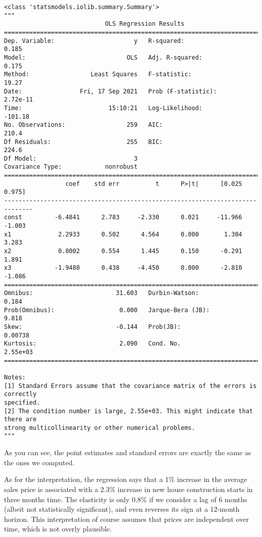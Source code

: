 \documentclass[10pt]{scrartcl}
\makeatletter
\newcommand{\boxspacing}{\kern\kvtcb@left@rule\kern\kvtcb@boxsep}
\newcommand{\prompt}[4]{
        {\ttfamily\llap{{\color{#2}[#3]:\hspace{3pt}#4}}\vspace{-\baselineskip}}
    }
\makeatother
\begin{document}
            \begin{tcolorbox}[breakable, size=fbox, boxrule=.5pt, pad at break*=1mm, opacityfill=0]
\prompt{Out}{outcolor}{27}{\boxspacing}
\begin{Verbatim}[commandchars=\\\{\}]
<class 'statsmodels.iolib.summary.Summary'>
"""
                            OLS Regression Results
==============================================================================
Dep. Variable:                      y   R-squared:                       0.185
Model:                            OLS   Adj. R-squared:                  0.175
Method:                 Least Squares   F-statistic:                     19.27
Date:                Fri, 17 Sep 2021   Prob (F-statistic):           2.72e-11
Time:                        15:10:21   Log-Likelihood:                -101.18
No. Observations:                 259   AIC:                             210.4
Df Residuals:                     255   BIC:                             224.6
Df Model:                           3
Covariance Type:            nonrobust
==============================================================================
                 coef    std err          t      P>|t|      [0.025      0.975]
------------------------------------------------------------------------------
const         -6.4841      2.783     -2.330      0.021     -11.966      -1.003
x1             2.2933      0.502      4.564      0.000       1.304       3.283
x2             0.8002      0.554      1.445      0.150      -0.291       1.891
x3            -1.9480      0.438     -4.450      0.000      -2.810      -1.086
==============================================================================
Omnibus:                       31.603   Durbin-Watson:                   0.184
Prob(Omnibus):                  0.000   Jarque-Bera (JB):                9.818
Skew:                          -0.144   Prob(JB):                      0.00738
Kurtosis:                       2.090   Cond. No.                     2.55e+03
==============================================================================

Notes:
[1] Standard Errors assume that the covariance matrix of the errors is correctly
specified.
[2] The condition number is large, 2.55e+03. This might indicate that there are
strong multicollinearity or other numerical problems.
"""
\end{Verbatim}
\end{tcolorbox}
        
    As you can see, the point estimates and standard errors are exactly the
same as the ones we computed.

As for the interpretation, the regression says that a 1\% increase in
the average sales price is associated with a 2.3\% increase in new house
construction starts in three months time. The elasticity is only 0.8\%
if we consider a lag of 6 months (albeit not statistically significant),
and even reverses its sign at a 12-month horizon. This interpretation of
course assumes that prices are independent over time, which is not
overly plausible.


    
    
    
\end{document}
